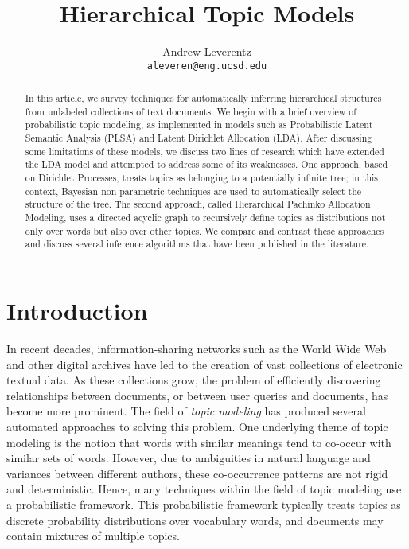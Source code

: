 \documentclass{article}
\title{Hierarchical Topic Models}
\author{
  Andrew Leverentz \\
  \texttt{aleveren@eng.ucsd.edu} \\
}
\begin{document}
\maketitle

\begin{abstract}
In this article, we survey techniques for automatically inferring hierarchical structures from unlabeled collections of text documents.
We begin with a brief overview of probabilistic topic modeling, as implemented in models such as Probabilistic Latent Semantic Analysis (PLSA) and Latent Dirichlet Allocation (LDA).
After discussing some limitations of these models, we discuss two lines of research which have extended the LDA model and attempted to address some of its weaknesses.
One approach, based on Dirichlet Processes, treats topics as belonging to a potentially infinite tree; in this context, Bayesian non-parametric techniques are used to automatically select the structure of the tree.
The second approach, called Hierarchical Pachinko Allocation Modeling, uses a directed acyclic graph to recursively define topics as distributions not only over words but also over other topics.
We compare and contrast these approaches and discuss several inference algorithms that have been published in the literature.
\end{abstract}

\section{Introduction}

In recent decades, information-sharing networks such as the World Wide Web and other digital archives have led to the creation of vast collections of electronic textual data.
As these collections grow, the problem of efficiently discovering relationships between documents, or between  user queries and documents, has become more prominent.
The field of \emph{topic modeling} has produced several automated approaches to solving this problem.
One underlying theme of topic modeling is the notion that words with similar meanings tend to co-occur with similar sets of words.
However, due to ambiguities in natural language and variances between different authors, these co-occurrence patterns are not rigid and deterministic.
Hence, many techniques within the field of topic modeling use a probabilistic framework.
This probabilistic framework typically treats topics as discrete probability distributions over vocabulary words, and documents may contain mixtures of multiple topics.
\end{document}
